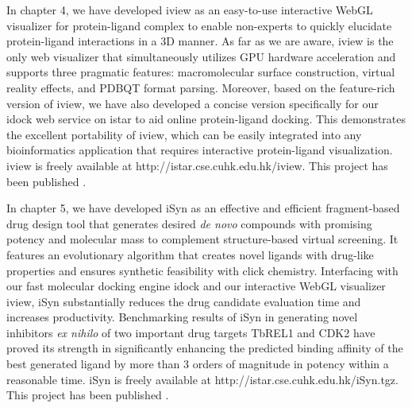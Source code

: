 In chapter 4, we have developed iview \citep{1366} as an easy-to-use interactive WebGL visualizer for protein-ligand complex to enable non-experts to quickly elucidate protein-ligand interactions in a 3D manner. As far as we are aware, iview is the only web visualizer that simultaneously utilizes GPU hardware acceleration and supports three pragmatic features: macromolecular surface construction, virtual reality effects, and PDBQT format parsing. Moreover, based on the feature-rich version of iview, we have also developed a concise version specifically for our idock web service on istar to aid online protein-ligand docking. This demonstrates the excellent portability of iview, which can be easily integrated into any bioinformatics application that requires interactive protein-ligand visualization. iview is freely available at http://istar.cse.cuhk.edu.hk/iview. This project has been published \citep{1366}.

In chapter 5, we have developed iSyn \citep{1409,1387} as an effective and efficient fragment-based drug design tool that generates desired \textit{de novo} compounds with promising potency and molecular mass to complement structure-based virtual screening. It features an evolutionary algorithm that creates novel ligands with drug-like properties and ensures synthetic feasibility with click chemistry. Interfacing with our fast molecular docking engine idock and our interactive WebGL visualizer iview, iSyn substantially reduces the drug candidate evaluation time and increases productivity. Benchmarking results of iSyn in generating novel inhibitors \textit{ex nihilo} of two important drug targets TbREL1 and CDK2 have proved its strength in significantly enhancing the predicted binding affinity of the best generated ligand by more than 3 orders of magnitude in potency within a reasonable time. iSyn is freely available at http://istar.cse.cuhk.edu.hk/iSyn.tgz. This project has been published \citep{1409,1387}.



